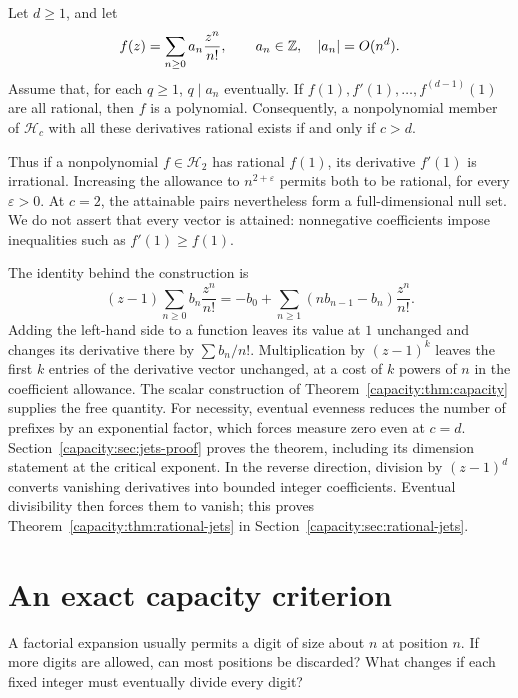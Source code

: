 \documentclass[11pt]{article}
\begin{document}
\begin{theorem}
\label{capacity:thm:rational-jets}
Let $d\ge1$, and let
\[
 f(z)=\sum_{n\ge0}a_n\frac{z^n}{n!},\qquad a_n\in\mathbb{Z},\quad |a_n|=O(n^d).
\]
Assume that, for each $q\ge1$, $q\mid a_n$ eventually.
If $f(1),f'(1),\ldots,f^{(d-1)}(1)$ are all rational, then $f$ is a polynomial.
Consequently, a nonpolynomial member of $\mathcal H_c$ with all these
derivatives rational exists if and only if $c>d$.
\end{theorem}

Thus if a nonpolynomial $f\in\mathcal H_2$ has rational $f(1)$, its derivative
$f'(1)$ is irrational. Increasing the allowance to $n^{2+\varepsilon}$
permits both to be rational, for every $\varepsilon>0$. At $c=2$, the
attainable pairs nevertheless form a full-dimensional null set.
We do not assert that every vector is attained:
nonnegative coefficients impose inequalities such as $f'(1)\ge f(1)$.

The identity behind the construction is
\[
 (z-1)\sum_{n\ge0}b_n\frac{z^n}{n!}
 =-b_0+\sum_{n\ge1}(n b_{n-1}-b_n)\frac{z^n}{n!}.
 \tag{J}\label{capacity:eq:jet-carry}
\]
Adding the left-hand side to a function leaves its value at $1$ unchanged
and changes its derivative there by
$\sum b_n/n!$. Multiplication by $(z-1)^k$ leaves the first $k$ entries of
the derivative vector unchanged, at a cost of $k$ powers of $n$ in the
coefficient allowance. The scalar construction of
Theorem~\ref{capacity:thm:capacity} supplies the free quantity.
For necessity, eventual evenness reduces the number of prefixes by an
exponential factor, which forces measure zero even at $c=d$.
Section~\ref{capacity:sec:jets-proof} proves the theorem, including its
dimension statement at the critical exponent. In the reverse direction,
division by $(z-1)^d$ converts vanishing derivatives into bounded integer
coefficients. Eventual divisibility then forces them to vanish; this proves
Theorem~\ref{capacity:thm:rational-jets} in
Section~\ref{capacity:sec:rational-jets}.


\section{An exact capacity criterion}\label{capacity:sec:criterion}
A factorial expansion usually permits a digit of size about $n$ at position
$n$. If more digits are allowed, can most positions be discarded? What changes
if each fixed integer must eventually divide every digit?
\end{document}
